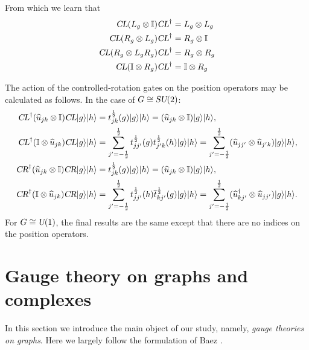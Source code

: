 \documentclass[12pt]{amsart}
\def\su2{\textsl{SU}(2)}
\def\uone{\textsl{U}(1)}
\def\CL{\textsl{CL}}
\def\CR{\textsl{CR}}
\theoremstyle{definition}
\theoremstyle{remark}
\numberwithin{equation}{section}
\begin{document}
From which we learn that
\begin{equation}
	\begin{split}
	\CL(L_g\otimes \mathbb{I}) \CL^\dag &= L_g \otimes L_g \\ 
	\CL(R_g\otimes L_g) \CL^\dag &= R_g\otimes \mathbb{I}\\
	\CL  (R_{g}\otimes L_g R_g)\CL^\dag &= R_g \otimes R_g \\
	\CL  (\mathbb{I}\otimes R_g )\CL^\dag &= \mathbb{I} \otimes R_g \\
	\end{split}
\end{equation}


The action of the controlled-rotation gates on the position operators may be calculated as follows.
In the case of $G\cong \su2$:
\begin{equation}
	\begin{split}
		\CL^\dag ( \widehat{u}_{jk}\otimes \mathbb{I} )\CL|g\rangle|h\rangle &= t_{jk}^{\frac12}(g)|g\rangle |h\rangle = ( \widehat{u}_{jk}\otimes \mathbb{I} )|g\rangle|h\rangle, \\
		\CL^\dag ( \mathbb{I}\otimes \widehat{u}_{jk}  )\CL|g\rangle|h\rangle &= \sum_{j'=-\frac12}^{\frac12}t_{jj'}^{\frac12}(g)t_{j'k}^{\frac12}(h)|g\rangle |h\rangle = \sum_{j'=-\frac12}^{\frac12}( \widehat{u}_{jj'}\otimes \widehat{u}_{j'k} )|g\rangle|h\rangle, \\
		\CR^\dag ( \widehat{u}_{jk}\otimes \mathbb{I} )\CR|g\rangle|h\rangle &= t_{jk}^{\frac12}(g)|g\rangle |h\rangle = ( \widehat{u}_{jk}\otimes \mathbb{I} )|g\rangle|h\rangle, \\
		\CR^\dag ( \mathbb{I}\otimes \widehat{u}_{jk}  )\CR|g\rangle|h\rangle &= \sum_{j'=-\frac12}^{\frac12}t_{jj'}^{\frac12}(h)\overline{t}_{kj'}^{\frac12}(g)|g\rangle |h\rangle = \sum_{j'=-\frac12}^{\frac12}( \widehat{u}_{kj'}^\dag\otimes \widehat{u}_{jj'} )|g\rangle|h\rangle. \\
	\end{split}
\end{equation}
For $G\cong \uone$, the final results are the same except that there are no 
indices on the position operators.

\section{Gauge theory on graphs and complexes}
In this section we introduce the main object of our study, namely, \emph{gauge theories on graphs}. Here we largely follow the formulation of Baez \cite{baez:1996a}.
\end{document}

